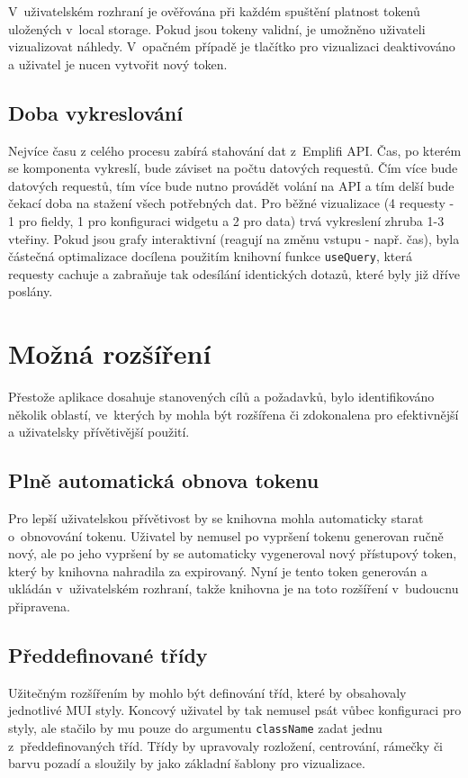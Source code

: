 \documentclass[czech, bc, kiv, he, iso690numb, viewonly]{fasthesis} %
\begin{document}
V~uživatelském rozhraní je ověřována při každém spuštění platnost tokenů uložených v~local storage. Pokud jsou tokeny validní, je umožněno uživateli vizualizovat náhledy. V~opačném
případě je tlačítko pro vizualizaci deaktivováno a uživatel je nucen vytvořit nový token.

\subsection{Doba vykreslování}
Nejvíce času z celého procesu zabírá stahování dat z~Emplifi API. Čas, po kterém se komponenta vykreslí, bude záviset na počtu datových requestů. Čím více bude
datových requestů, tím více bude nutno provádět volání na API a tím delší bude čekací doba na stažení všech potřebných dat. Pro běžné vizualizace (4 requesty - 1 pro fieldy,
1 pro konfiguraci widgetu a 2 pro data) trvá vykreslení zhruba 1-3 vteřiny. Pokud jsou grafy interaktivní (reagují na změnu vstupu - např. čas), byla částečná optimalizace
docílena použitím knihovní funkce \texttt{useQuery}, která requesty cachuje a zabraňuje tak odesílání identických dotazů, které byly již dříve poslány.

\section{Možná rozšíření}
Přestože aplikace dosahuje stanovených cílů a požadavků, bylo identifikováno několik oblastí, ve~kterých by mohla být rozšířena či zdokonalena pro
efektivnější a uživatelsky přívětivější použití.
~
\subsection{Plně automatická obnova tokenu}
Pro lepší uživatelskou přívětivost by se knihovna mohla automaticky starat o~obnovování tokenu. Uživatel by nemusel po vypršení tokenu generovan ručně nový, ale
po jeho vypršení by se automaticky vygeneroval nový přístupový token, který by knihovna nahradila za expirovaný.
Nyní je tento token generován a ukládán v~uživatelském rozhraní, takže knihovna je na toto rozšíření v~budoucnu připravena.

\subsection{Předdefinované třídy}
Užitečným rozšířením by mohlo být definování tříd, které by obsahovaly jednotlivé MUI styly. Koncový uživatel by tak nemusel psát vůbec konfiguraci pro styly,
ale stačilo by mu pouze do argumentu \texttt{className} zadat jednu z~předdefinovaných tříd. Třídy by upravovaly rozložení, centrování, rámečky či barvu pozadí a sloužily
by jako základní šablony pro vizualizace.
\end{document}
